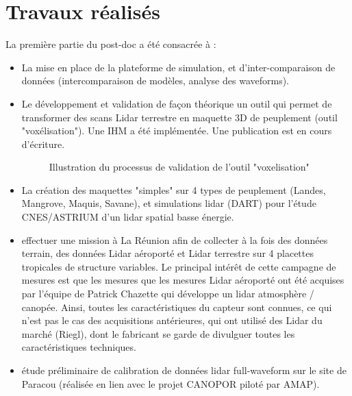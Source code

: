 \documentclass[a4paper,11pt]{article}
\begin{document}
\section{Travaux réalisés}
La première partie du post-doc a été consacrée à :
\begin{itemize}
\item La mise en place de la plateforme de simulation, et d'inter-comparaison de données (intercomparaison de modèles, analyse des waveforms). 
\item Le développement et validation de façon théorique un outil qui permet de transformer des scans Lidar terrestre en maquette 3D de peuplement (outil "voxélisation"). Une IHM a été implémentée. Une publication est en cours d'écriture.
\begin{figure}[!htpb]
\centering
{}
\caption{Illustration du processus de validation de l'outil "voxelisation"}
\label{fig:voxelisation}
\end{figure}
\item La création des maquettes "simples" sur 4 types de peuplement (Landes, Mangrove, Maquis, Savane), et simulations lidar (DART) pour l'étude CNES/ASTRIUM d'un lidar spatial basse énergie.
\item effectuer une mission à La Réunion afin de collecter à la fois des données terrain, des données Lidar aéroporté et Lidar terrestre sur 4 placettes tropicales de structure variables. Le principal intérêt de cette campagne de mesures est que les mesures que les mesures Lidar aéroporté ont été acquises par l'équipe de Patrick Chazette qui développe un lidar atmosphère / canopée. Ainsi, toutes les caractéristiques du capteur sont connues, ce qui n'est pas le cas des acquisitions antérieures, qui ont utilisé des Lidar du marché (Riegl), dont le fabricant se garde de divulguer toutes les caractéristiques techniques.
\item étude préliminaire de calibration de données lidar full-waveform sur le site de Paracou (réalisée en lien avec le projet CANOPOR piloté par AMAP).
\end{itemize}
\end{document}
